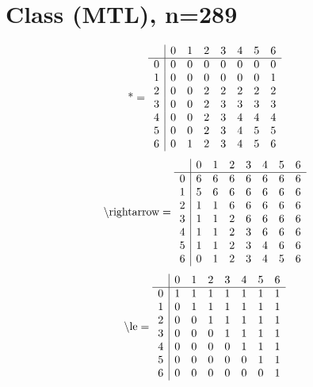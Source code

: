 \documentclass[11pt]{article}
\begin{document}
\section{Class (MTL), n=289}
\[\text{*} = 
\begin{array}{r | r r r r r r r}
 & 0 & 1 & 2 & 3 & 4 & 5 & 6 \\ \hline
0 & 0 & 0 & 0 & 0 & 0 & 0 & 0 \\
1 & 0 & 0 & 0 & 0 & 0 & 0 & 1 \\
2 & 0 & 0 & 2 & 2 & 2 & 2 & 2 \\
3 & 0 & 0 & 2 & 3 & 3 & 3 & 3 \\
4 & 0 & 0 & 2 & 3 & 4 & 4 & 4 \\
5 & 0 & 0 & 2 & 3 & 4 & 5 & 5 \\
6 & 0 & 1 & 2 & 3 & 4 & 5 & 6 \\
\end{array}
\]
\[\text{\textbackslash rightarrow} = 
\begin{array}{r | r r r r r r r}
 & 0 & 1 & 2 & 3 & 4 & 5 & 6 \\ \hline
0 & 6 & 6 & 6 & 6 & 6 & 6 & 6 \\
1 & 5 & 6 & 6 & 6 & 6 & 6 & 6 \\
2 & 1 & 1 & 6 & 6 & 6 & 6 & 6 \\
3 & 1 & 1 & 2 & 6 & 6 & 6 & 6 \\
4 & 1 & 1 & 2 & 3 & 6 & 6 & 6 \\
5 & 1 & 1 & 2 & 3 & 4 & 6 & 6 \\
6 & 0 & 1 & 2 & 3 & 4 & 5 & 6 \\
\end{array}
\]
\[\text{\textbackslash le} = 
\begin{array}{r | r r r r r r r}
 & 0 & 1 & 2 & 3 & 4 & 5 & 6 \\ \hline
0 & 1 & 1 & 1 & 1 & 1 & 1 & 1 \\
1 & 0 & 1 & 1 & 1 & 1 & 1 & 1 \\
2 & 0 & 0 & 1 & 1 & 1 & 1 & 1 \\
3 & 0 & 0 & 0 & 1 & 1 & 1 & 1 \\
4 & 0 & 0 & 0 & 0 & 1 & 1 & 1 \\
5 & 0 & 0 & 0 & 0 & 0 & 1 & 1 \\
6 & 0 & 0 & 0 & 0 & 0 & 0 & 1 \\
\end{array}
\]
\end{document}

